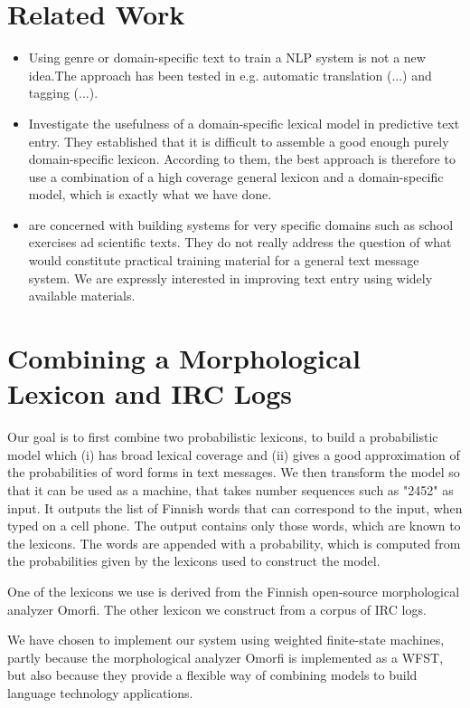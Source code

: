 \documentclass[a4paper,conference]{IEEEtran}
\begin{document}
\section{Related Work}
\label{sec:related-work}

\begin{itemize}
\item Using genre or domain-specific text to train a NLP system is not
  a new idea.The approach has been tested in e.g. automatic
  translation (...) and tagging (...).
\item \cite{Harbusch/2003} Investigate the usefulness of a
  domain-specific lexical model in predictive text entry. They
  established that it is difficult to assemble a good enough purely
  domain-specific lexicon. According to them, the best approach is
  therefore to use a combination of a high coverage general lexicon
  and a domain-specific model, which is exactly what we have done.
\item \cite{Harbusch/2003} are concerned with building systems for very
  specific domains such as school exercises ad scientific texts. They
  do not really address the question of what would constitute
  practical training material for a general text message system. We
  are expressly interested in improving text entry using widely
  available materials.
\end{itemize}

\section{Combining a Morphological Lexicon and IRC Logs}
\label{sec:methods}

Our goal is to first combine two probabilistic lexicons, to build a
probabilistic model which (i) has broad lexical coverage and (ii)
gives a good approximation of the probabilities of word forms in text
messages. We then transform the model so that it can be used as a
machine, that takes number sequences such as "2452" as input. It
outputs the list of Finnish words that can correspond to the input,
when typed on a cell phone. The output contains only those words,
which are known to the lexicons. The words are appended with a
probability, which is computed from the probabilities given by the
lexicons used to construct the model.

One of the lexicons we use is derived from the Finnish open-source
morphological analyzer Omorfi. The other lexicon we construct from a
corpus of IRC logs.

We have chosen to implement our system using weighted finite-state
machines, partly because the morphological analyzer Omorfi is
implemented as a WFST, but also because they provide a flexible way of
combining models to build language technology applications.
\end{document}
